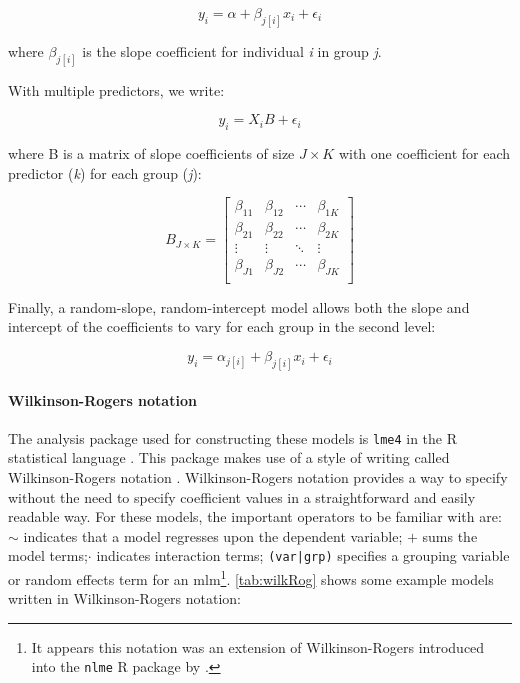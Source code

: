 \begin{equation}
  y_i = \alpha + \beta_{j[i]}x_i + \epsilon_i
\end{equation}

where $\beta_{j[i]}$ is the slope coefficient for individual \emph{i} in group \emph{j}. 

With multiple predictors, we write:

\begin{equation}
  y_i = X_i B + \epsilon_i
\end{equation}

where B is a matrix of slope coefficients of size $J\times K$ with one coefficient for each predictor (\emph{k}) for each group (\emph{j}):

\[
  B_{J\times K} =
  \left[ {\begin{array}{cccc}
    \beta_{11} & \beta_{12} & \cdots & \beta_{1K}\\
    \beta_{21} & \beta_{22} & \cdots & \beta_{2K}\\
    \vdots & \vdots & \ddots & \vdots\\
    \beta_{J1} & \beta_{J2} & \cdots & \beta_{JK}\\
  \end{array} } \right]
\]

Finally, a random-slope, random-intercept model allows both the slope and intercept of the coefficients to vary for each group in the second level:

\begin{equation}
  y_i = \alpha_{j[i]} + \beta_{j[i]}x_i + \epsilon_i
\end{equation}

\paragraph*{Wilkinson-Rogers notation}
The analysis package used for constructing these models is \texttt{lme4} \citep{Bates2015Fitting} in the R statistical language \citep{RCT2018R}. This package makes use of a style of writing  called Wilkinson-Rogers notation \citep{Wilkinson1973Symbolic}. Wilkinson-Rogers notation provides a way to specify  without the need to specify coefficient values in a straightforward and easily readable way. For these models, the important operators to be familiar with are: $\sim$ indicates that a model regresses upon the dependent variable; $+$ sums the model terms;$\cdot$ indicates interaction terms; \texttt{(var|grp)} specifies a grouping variable or random effects term for an \gls{mlm}\footnote{It appears this notation was an extension of Wilkinson-Rogers introduced into the \texttt{nlme} R package by \citet{Pinheiro1997Graphical}.}. \cref{tab:wilkRog} shows some example models written in Wilkinson-Rogers notation:

